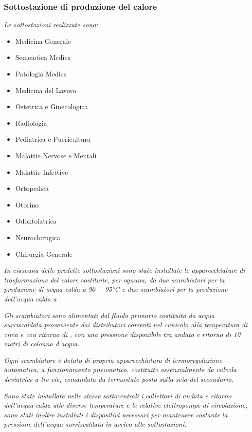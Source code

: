 \begin{quoting}
\subsubsection{Sottostazione di produzione del calore}
\emph{Le sottostazioni realizzate sono:}
\begin{itemize}
	\item Medicina Generale
	\item Semeiotica Medica
	\item Patologia Medica
	\item Medicina del Lavoro
	\item Ostetrica e Ginecologica
	\item Radiologia
	\item Pediatrica e Puericultura
	\item Malattie Nervose e Mentali
	\item Malattie Infettive
	\item Ortopedica
	\item Otorino
	\item Odontoiatrica
	\item Neurochirugica
	\item Chirurgia Generale
\end{itemize}
\vspace{0.5em}
	\noindent\emph{In ciascuna delle predette sottostazioni sono state installate le apparecchiature di trasformazione del calore costituite, per ognuna, da due scambiatori per la produzione di acqua calda a \num{90}} + \emph{\num{95}\si{\degreeCelsius} e due scambiatori per la produzione dell'acqua calda a .}
	
	\emph{Gli scambiatori sono alimentati dal fluido primario costituito da acqua surriscaldata proveniente dai distributori correnti nel cunicolo alla temperatura di circa  e con ritorno di , con una pressione disponibile tra andata e ritorno di 10 metri di colonna d'acqua.}
	
	\emph{Ogni scambiatore è dotato di propria apparecchiatura di termoregolazione automatica, a funzionamento pneumatico, costituito essenzialmente da valvola deviatrice a tre vie, comandata da termostato posto sulla scia del secondario.}
	
	\emph{Sono state installate nelle stesse sottocentrali i collettori di andata e ritorno dell'acqua calda alle diverse temperature e le relative elettropompe di circolazione; sono stati inoltre installati i dispositivi necessari per mantenere costante la pressione dell'acqua surriscaldata in arrivo alle sottostazioni.}
	

\end{quoting}
